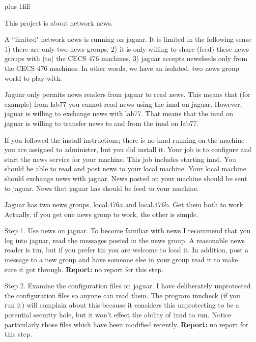 
\rightskip=0pt plus 1fill

\parindent 0pt

This project is about network news.

A ``limited" network news is running on jaguar.
It is limited in the following sense
1) there are only two news groups,
2) it is only willing to share (feed) these news groups with (to) the CECS 476
machines,
3) jaguar accepts newsfeeds only from the CECS 476 machines.
In other words, we have an isolated, two news group world to play with.

Jaguar only permits news readers from jaguar to read news.
This means that (for example) from {\ltt{}lab77} you cannot
read news using the {\ltt{}innd} on jaguar.
However, jaguar is willing to exchange news with {\ltt{}lab77}.
That means that the {\ltt{}innd} on {\ltt{}jaguar} is willing to transfer
news to and from the {\ltt{}innd} on {\ltt{}lab77}.

If you followed the install instructions;
there is no {\ltt{}innd} running on the machine you are assigned to administer,
but you did install it.
Your job is to configure and start the news service for your machine.
This job includes starting {\ltt{}innd}.
You should be able to read and post news to your local machine.
Your local machine should exchange news with {\ltt{}jaguar}.
News posted on your machine should be sent to {\ltt{}jaguar}.
News that {\ltt{}jaguar} has should be feed to your machine.

Jaguar has two news groups, {\ltt{}local.476a} and {\ltt{}local.476b}.
Get them both to work.
Actually, if you get one news group to work, the other is simple.

Step 1. Use news on {\ltt{}jaguar}.
To become familiar with news I recommend that you log into {\ltt{}jaguar},
read the messages posted in the news group.
A reasonable news reader is {\ltt{}trn},
but if you prefer {\ltt{}tin} you are welcome to load it.
In addition, post a message to a new group and have someone else in your group
read it to make sure it got through.
\hfill\break
{\bf Report:} no report for this step.

Step 2.
Examine the configuration files on {\ltt{}jaguar}.
I have deliberately unprotected the configuration files so anyone can read
them.
The program {\ltt{}inncheck} (if you run it) will complain about this 
because it considers this unprotecting to be a potential security hole,
but it won't effect the ability of {\ltt{}innd} to run.
Notice particularly those files which have been modified recently.
\hfill\break
{\bf Report:} no report for this step.

